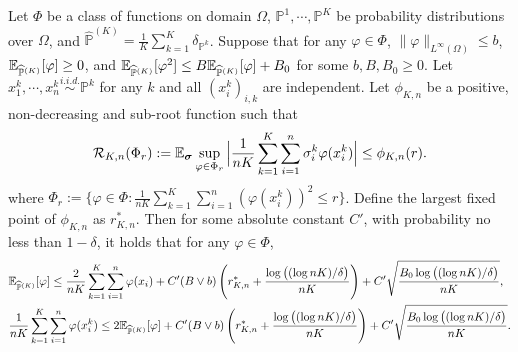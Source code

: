 \documentclass[11pt]{article}
\numberwithin{equation}{section}
\renewcommand{\P}{\mathbb{P}}
\begin{document}
\begin{lemma}\label{lem:local_rademacher_meta}
    Let $\Phi$ be a class of functions on domain $\Omega$, $\P^1,\cdots,\P^K$ be probability distributions over $\Omega$, 
    and $\widehat{\P}^{(K)}=\frac{1}{K}\sum_{k=1}^K\delta_{\P^k}$.
    Suppose that for any $\varphi\in\Phi$, $\|\varphi\|_{L^\infty(\Omega)}\leq b$, $\E_{\widehat{\P}^{(K)}} [\varphi]\geq 0$, and $\E_{\widehat{\P}^{(K)}} [\varphi^2] \leq B\E_{\widehat{\P}^{(K)}} [\varphi]+B_0$ for some $b,B,B_0\geq 0$. 
    Let $x^k_1,\cdots,x^k_n\overset{\textit{i.i.d.}}{\sim}\P^k$ for any $k$ and all $(x_i^k)_{i,k}$ are independent. 
    Let $\phi_{K,n}$ be a positive, non-decreasing and sub-root function such that
    \begin{equation}
        \mathcal{R}_{K,n}(\Phi_r):=\mathbb{E}_{\bm{\sigma}} \sup_{\varphi\in\Phi_r}\Big|\frac{1}{nK}\sum_{k=1}^K\sum_{i=1}^n\sigma_i^k\varphi(x_i^k)\Big|\leq \phi_{K,n}(r).
    \end{equation}
    where $\Phi_r:= \Big\{\varphi\in\Phi: \frac{1}{nK}\sum_{k=1}^K\sum_{i=1}^n{(\varphi(x_i^k))^2}\leq r\Big\}$.
    Define the largest fixed point of $\phi_{K,n}$ as $r_{K,n}^*$.
    Then for some absolute constant $C'$, with probability no less than $1-\delta$, it holds that for any $\varphi\in\Phi$,
    \begin{align}
        &\E_{\widehat{\P}^{(K)}}[\varphi]\leq \frac{2}{nK}\sum_{k=1}^K\sum_{i=1}^n\varphi(x_i) + C'(B\vee b)\left(r_{K,n}^* + \frac{\log\big((\log nK)/\delta\big)}{nK}\right)+C'\sqrt{\frac{B_0\log\big((\log nK)/\delta\big)}{nK}},\\
        &\frac{1}{nK}\sum_{k=1}^K\sum_{i=1}^n\varphi(x_i^k)\leq 2\E_{\widehat{\P}^{(K)}}[\varphi] + C'(B\vee b)\left(r_{K,n}^* + \frac{\log\big((\log nK)/\delta\big)}{nK}\right)+C'\sqrt{\frac{B_0\log\big((\log nK)/\delta\big)}{nK}}. 
    \end{align}
\end{lemma}
\end{document}
